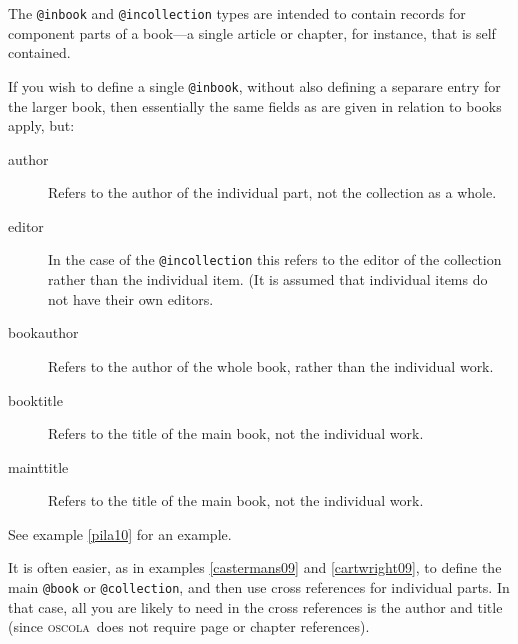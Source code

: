 \documentclass[a5paper,fontsize=9pt,DIV=1]{scrartcl}
\newcommand{\oscolashort}{\textsc{oscola}\nocite{oscola}}
\begin{document}
The \texttt{@inbook} and \texttt{@incollection} types are intended to
contain records for component parts of a book---a single article or
chapter, for instance, that is self contained.

If you wish to define a single \texttt{@inbook}, without also defining
a separare entry for the larger book, then essentially the same fields
as are given in relation to books apply, but: 
\begin{description}
\item[author]
Refers to the author of the individual part, not the
collection as a whole.  
\item[editor] 
In the case of the
\texttt{@incollection} this refers to the editor of the collection
rather than the individual item. (It is assumed that individual items
do not have their own editors.  
\item[bookauthor] 
Refers to the author of the whole book, rather than the individual work.  
\item[booktitle]
Refers to the title of the main book, not the individual work.
\item[mainttitle] 
Refers to the title of the main book, not the
individual work.  
\end{description}
See example \ref{pila10} for an example.

It is often easier, as in examples \ref{castermans09} and \ref{cartwright09}, to define the main \texttt{@book} or
\texttt{@collection}, and then use cross references for individual
parts. In that case, all you are likely to need in the cross
references is the author and title (since \oscolashort\ does not
require page or chapter references).
\end{document}
